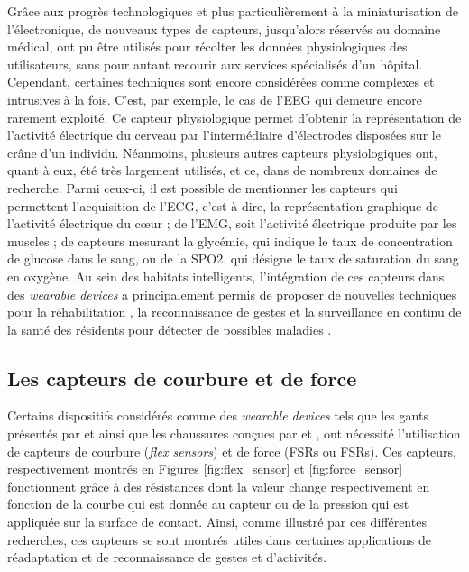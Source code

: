 Grâce aux progrès technologiques et plus particulièrement à la miniaturisation de l'électronique, de nouveaux types de capteurs, jusqu'alors réservés au domaine médical, ont pu être utilisés pour récolter les données physiologiques des utilisateurs, sans pour autant recourir aux services spécialisés d'un hôpital. Cependant, certaines techniques sont encore considérées comme complexes et intrusives à la fois. C'est, par exemple, le cas de l'\ac{EEG} qui demeure encore rarement exploité. Ce capteur physiologique permet d'obtenir la représentation de l'activité électrique du cerveau par l'intermédiaire d'électrodes disposées sur le crâne d'un individu. Néanmoins, plusieurs autres capteurs physiologiques ont, quant à eux, été très largement utilisés, et ce, dans de nombreux domaines de recherche. Parmi ceux-ci, il est possible de mentionner les capteurs qui permettent l'acquisition de l'\ac{ECG}, c'est-à-dire, la représentation graphique de l'activité électrique du c\oe{}ur ; de l'\ac{EMG}, soit l'activité électrique produite par les muscles ; de capteurs mesurant la glycémie, qui indique le taux de concentration de glucose dans le sang, ou de la \ac{SPO2}, qui désigne le taux de saturation du sang en oxygène. Au sein des habitats intelligents, l'intégration de ces capteurs dans des \textit{wearable devices} a principalement permis de proposer de nouvelles techniques pour la réhabilitation \citep{YuanJieFan2014}, la reconnaissance de gestes \citep{Jung2015, Benatti2015, Tavakoli2018} et la surveillance en continu de la santé des résidents pour détecter de possibles maladies \citep{Istepanian2011, Adib2015, Khan2016}.

\subsection{Les capteurs de courbure et de force}

Certains dispositifs considérés comme des \textit{wearable devices} tels que les gants présentés par \cite{Sanford2015} et \cite{Zheng2016} ainsi que les chaussures conçues par \cite{Bamberg2008} et \cite{Bae2013}, ont nécessité l'utilisation de capteurs de courbure (\textit{flex sensors}) et de force (\aclp{FSR} ou \acsp{FSR}). Ces capteurs, respectivement montrés en Figures \ref{fig:flex_sensor} et \ref{fig:force_sensor} fonctionnent grâce à des résistances dont la valeur change respectivement en fonction de la courbe qui est donnée au capteur ou de la pression qui est appliquée sur la surface de contact. Ainsi, comme illustré par ces différentes recherches, ces capteurs se sont montrés utiles dans certaines applications de réadaptation et de reconnaissance de gestes et d'activités.

